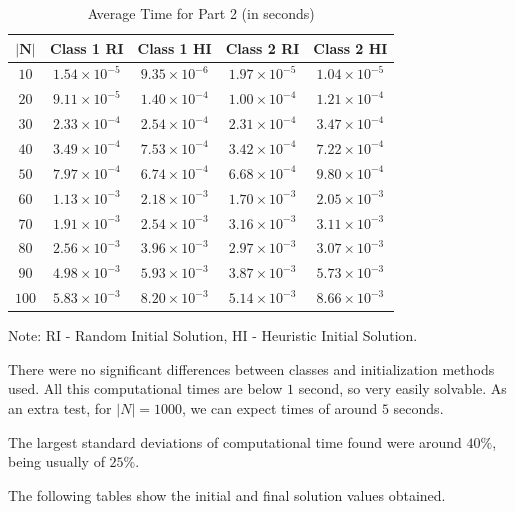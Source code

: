 \documentclass[a4paper,12pt]{article}
\begin{document}
		
	\begin{table}[H]
		\centering
		\begin{tabular}{c|c|c|c|c}
			$\mathbf{|N|}$ 	& \textbf{Class 1 RI}  & \textbf{Class 1 HI}& \textbf{Class 2 RI} & \textbf{Class 2 HI}  \\ \hline
			$ 10  $			& $1.54\times10^{-5}$ & $9.35\times10^{-6}$& $1.97\times10^{-5}$ & $1.04\times10^{-5}$ \\ \hline
			$ 20  $			& $9.11\times10^{-5}$ & $1.40\times10^{-4}$& $1.00\times10^{-4}$ & $1.21\times10^{-4}$ \\ \hline
			$ 30  $			& $2.33\times10^{-4}$ & $2.54\times10^{-4}$& $2.31\times10^{-4}$ & $3.47\times10^{-4}$ \\ \hline
			$ 40  $			& $3.49\times10^{-4}$ & $7.53\times10^{-4}$& $3.42\times10^{-4}$ & $7.22\times10^{-4}$\\ \hline
			$ 50  $			& $7.97\times10^{-4}$ & $6.74\times10^{-4}$& $6.68\times10^{-4}$ & $9.80\times10^{-4}$ \\ \hline
			$ 60  $			& $1.13\times10^{-3}$ & $2.18\times10^{-3}$& $1.70\times10^{-3}$ & $2.05\times10^{-3}$ \\ \hline
			$ 70 $			& $1.91\times10^{-3}$ & $2.54\times10^{-3}$& $3.16\times10^{-3}$ & $3.11\times10^{-3}$\\ \hline
			$ 80 $			& $2.56\times10^{-3}$ & $3.96\times10^{-3}$& $2.97\times10^{-3}$ & $3.07\times10^{-3}$\\ \hline
			$ 90 $			& $4.98\times10^{-3}$ & $5.93\times10^{-3}$& $3.87\times10^{-3}$ & $5.73\times10^{-3}$\\ \hline
			$ 100 $			& $5.83\times10^{-3}$ & $8.20\times10^{-3}$& $5.14\times10^{-3}$ & $8.66\times10^{-3}$\\
		\end{tabular}
		\caption{Average Time for Part 2 (in seconds)}
		\label{table:times2}
	\end{table}
	Note: RI - Random Initial Solution, HI - Heuristic Initial Solution.
	
	There were no significant differences between classes and initialization methods used.
	All this computational times are below $ 1 $ second, so very easily solvable.
	As an extra test, for $ |N| = 1000 $, we can expect times of around $ 5 $ seconds.
	
	The largest standard deviations of computational time found were around $40\%$, being usually of $25\%$.
	
	The following tables show the initial and final solution values obtained.
\end{document}
